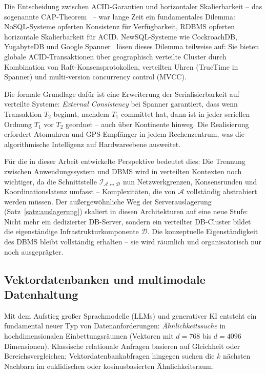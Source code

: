 ﻿\documentclass[a4paper,12pt]{article}
\theoremstyle{definition}
\begin{document}
Die Entscheidung zwischen ACID-Garantien und horizontaler Skalierbarkeit -- das sogenannte CAP-Theorem~\cite{brewer2000cap} -- war lange Zeit ein fundamentales Dilemma: NoSQL-Systeme opferten Konsistenz für Verfügbarkeit, RDBMS opferten horizontale Skalierbarkeit für ACID. NewSQL-Systeme wie CockroachDB, YugabyteDB und Google Spanner~\cite{corbett2013spanner} lösen dieses Dilemma teilweise auf: Sie bieten globale ACID-Transaktionen über geographisch verteilte Cluster durch Kombination von Raft-Konsensprotokollen, verteilten Uhren (TrueTime in Spanner) und multi-version concurrency control (MVCC).

Die formale Grundlage dafür ist eine Erweiterung der Serialisierbarkeit auf verteilte Systeme: \emph{External Consistency} bei Spanner garantiert, dass wenn Transaktion $T_2$ beginnt, nachdem $T_1$ committet hat, dann ist in jeder seriellen Ordnung $T_1$ vor $T_2$ geordnet -- auch über Kontinente hinweg. Die Realisierung erfordert Atomuhren und GPS-Empfänger in jedem Rechenzentrum, was die algorithmische Intelligenz auf Hardwareebene ausweitet.

Für die in dieser Arbeit entwickelte Perspektive bedeutet dies: Die Trennung zwischen Anwendungssystem und DBMS wird in verteilten Kontexten noch wichtiger, da die Schnittstelle $\mathcal{I}_{\mathcal{A} \leftrightarrow \mathcal{D}}$ nun Netzwerkgrenzen, Konsensrunden und Koordinationslatenz umfasst -- Komplexitäten, die von $\mathcal{A}$ vollständig abstrahiert werden müssen. Der außergewöhnliche Weg der Serverauslagerung (Satz~\ref{satz:auslagerung}) skaliert in diesen Architekturen auf eine neue Stufe: Nicht mehr ein dedizierter DB-Server, sondern ein verteilter DB-Cluster bildet die eigenständige Infrastrukturkomponente $\mathcal{D}$. Die konzeptuelle Eigenständigkeit des DBMS bleibt vollständig erhalten -- sie wird räumlich und organisatorisch nur noch ausgeprägter.

\subsection{Vektordatenbanken und multimodale Datenhaltung}

Mit dem Aufstieg großer Sprachmodelle (LLMs) und generativer KI entsteht ein fundamental neuer Typ von Datenanforderungen: \emph{Ähnlichkeitssuche} in hochdimensionalen Einbettungsräumen (Vektoren mit $d = 768$ bis $d = 4096$ Dimensionen). Klassische relationale Anfragen basieren auf Gleichheit oder Bereichsvergleichen; Vektordatenbankabfragen hingegen suchen die $k$ nächsten Nachbarn im euklidischen oder kosinusbasierten Ähnlichkeitsraum.
\end{document}
